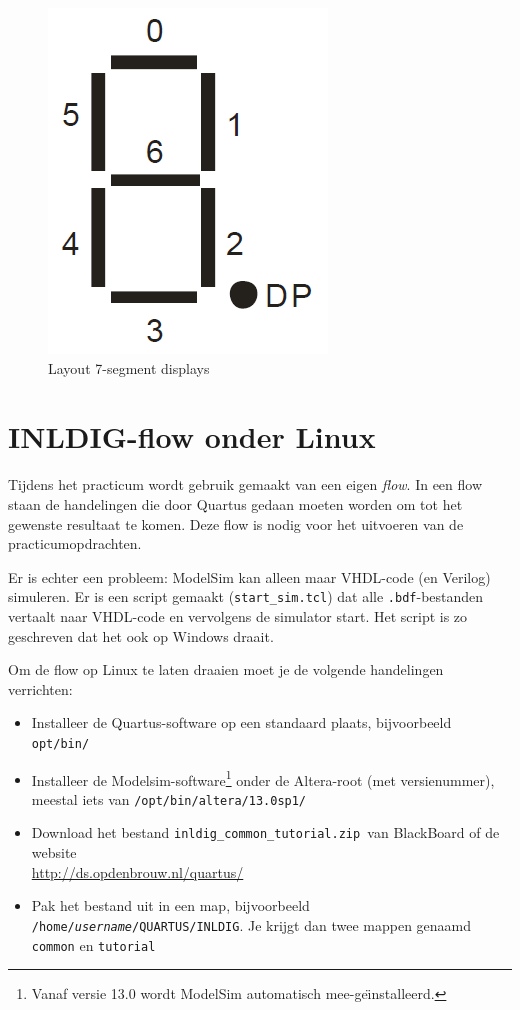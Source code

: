 \documentclass[a4paper,12pt,fleqn,twoside]{book}
\newcommand{\naam}[1]{\texttt{#1}}
\begin{document}
\begin{figure}[H]
\centering
\includegraphics[scale=0.25]{004layout7seg.png}
\caption{Layout 7-segment displays}
\label{fig:004layout7seg}
\end{figure}



\chapter{INLDIG-flow onder Linux}
\label{chap:inldigflowonderlinux}
Tijdens het practicum wordt gebruik gemaakt van een eigen \textsl{flow}.
In een flow staan de handelingen die door Quartus gedaan moeten worden om
tot het gewenste resultaat te komen. Deze flow is nodig voor het uitvoeren
van de practicumopdrachten. 

Er is echter een probleem: ModelSim kan alleen maar VHDL-code (en Verilog)
simuleren. Er is een script gemaakt (\lstinline|start_sim.tcl|) dat alle
\naam{.bdf}-bestanden vertaalt naar VHDL-code en vervolgens de simulator
start. Het script is zo geschreven dat het ook op Windows draait.

Om de flow op Linux te laten draaien moet je de volgende handelingen
verrichten:

\begin{itemize}\itemsep-1pt
\item Installeer de Quartus-software op een standaard plaats, bijvoorbeeld
      \lstinline|opt/bin/|
\item Installeer de Modelsim-software\footnote{Vanaf versie 13.0 wordt
      ModelSim automatisch mee-ge\"{\i}nstalleerd.} onder de Altera-root
      (met versienummer), meestal iets van \lstinline|/opt/bin/altera/13.0sp1/| 
\item Download het bestand \lstinline|inldig_common_tutorial.zip |van
      BlackBoard of de website\\ \url{http://ds.opdenbrouw.nl/quartus/} 
\item Pak het bestand uit in een map, bijvoorbeeld
      \naam{/home/\textsl{username}/QUARTUS/INLDIG}. Je krijgt dan twee
      mappen genaamd \naam{common} en \naam{tutorial}
\end{itemize}
\end{document}
